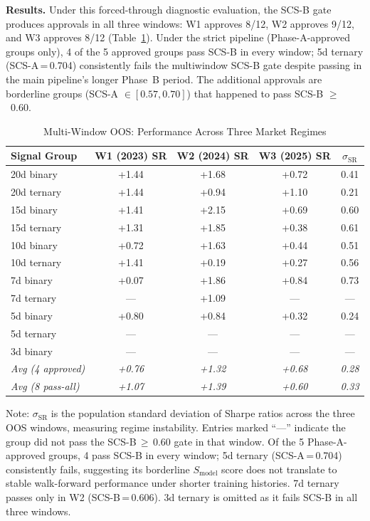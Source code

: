 \documentclass[12pt,a4paper]{article}
\begin{document}
\textbf{Results.} Under this forced-through diagnostic evaluation, the SCS-B gate produces approvals in all three windows: W1 approves 8/12, W2 approves 9/12, and W3 approves 8/12 (Table~\ref{tab:multiwindow_results}). Under the strict pipeline (Phase-A-approved groups only), 4 of the 5 approved groups pass SCS-B in every window; 5d ternary (SCS-A\,=\,0.704) consistently fails the multiwindow SCS-B gate despite passing in the main pipeline's longer Phase~B period. The additional approvals are borderline groups (SCS-A $\in [0.57, 0.70]$) that happened to pass SCS-B $\geq$~0.60.

\begin{table}[H]
\centering
\caption{Multi-Window OOS: Performance Across Three Market Regimes}
\label{tab:multiwindow_results}
\small
\begin{tabular}{lcccc}
\toprule
Signal Group & W1 (2023) SR & W2 (2024) SR & W3 (2025) SR & $\sigma_{\text{SR}}$ \\
\midrule
20d binary  & +1.44 & +1.68 & +0.72 & 0.41 \\
20d ternary & +1.44 & +0.94 & +1.10 & 0.21 \\
15d binary  & +1.41 & +2.15 & +0.69 & 0.60 \\
15d ternary & +1.31 & +1.85 & +0.38 & 0.61 \\
10d binary  & +0.72 & +1.63 & +0.44 & 0.51 \\
10d ternary & +1.41 & +0.19 & +0.27 & 0.56 \\
7d binary   & +0.07 & +1.86 & +0.84 & 0.73 \\
7d ternary  & ---   & +1.09 & ---   & --- \\
5d binary   & +0.80 & +0.84 & +0.32 & 0.24 \\
5d ternary  & ---   & ---   & ---   & --- \\
3d binary   & ---   & ---   & ---   & --- \\
\midrule
\textit{Avg (4 approved)} & \textit{+0.76} & \textit{+1.32} & \textit{+0.68} & \textit{0.28} \\
\textit{Avg (8 pass-all)} & \textit{+1.07} & \textit{+1.39} & \textit{+0.60} & \textit{0.33} \\
\bottomrule
\end{tabular}
\smallskip

\footnotesize{Note: $\sigma_{\text{SR}}$ is the population standard deviation of Sharpe ratios across the three OOS windows, measuring regime instability. Entries marked ``---'' indicate the group did not pass the SCS-B\,$\geq$\,0.60 gate in that window. Of the 5 Phase-A-approved groups, 4 pass SCS-B in every window; 5d ternary (SCS-A\,=\,0.704) consistently fails, suggesting its borderline $S_{\text{model}}$ score does not translate to stable walk-forward performance under shorter training histories. 7d ternary passes only in W2 (SCS-B\,=\,0.606). 3d ternary is omitted as it fails SCS-B in all three windows.}
\end{table}
\end{document}
